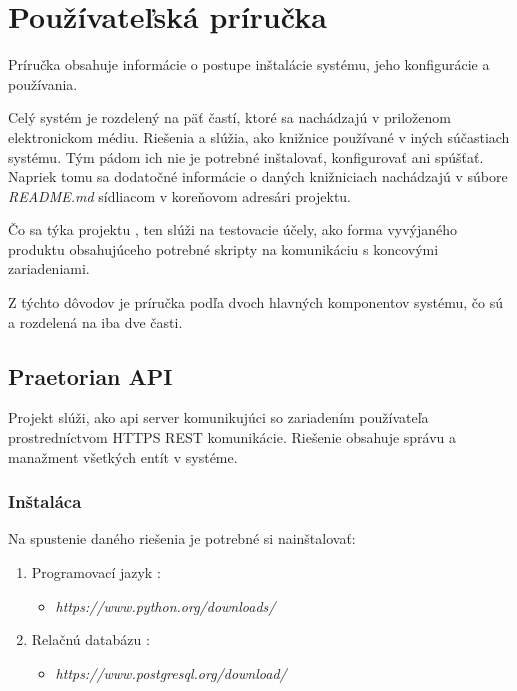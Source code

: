 \renewcommand\chaptername{Príloha}

\chapter{Používateľská príručka}

\renewcommand*{\thepage}{C\arabic{page}}
\setcounter{page}{1}

Príručka obsahuje informácie o postupe inštalácie systému, jeho konfigurácie a používania.

Celý systém je rozdelený na päť častí, ktoré sa nachádzajú v priloženom elektronickom médiu.
Riešenia  a  slúžia, ako knižnice používané v iných súčastiach systému.
Tým pádom ich nie je potrebné inštalovať, konfigurovať ani spúšťať.
Napriek tomu sa dodatočné informácie o daných knižniciach nachádzajú v súbore \emph{README.md} sídliacom v koreňovom adresári projektu.

Čo sa týka projektu , ten slúži na testovacie účely, ako forma vyvýjaného produktu
obsahujúceho potrebné skripty na komunikáciu s koncovými zariadeniami.

Z týchto dôvodov je príručka podľa dvoch hlavných komponentov systému, čo sú  a  rozdelená na iba dve časti.


\section{Praetorian API}

Projekt slúži, ako api server komunikujúci so zariadením používateľa prostredníctvom HTTPS REST komunikácie.
Riešenie obsahuje správu a manažment všetkých entít v systéme.

\subsection{Inštaláca}

Na spustenie daného riešenia je potrebné si nainštalovať:

\begin{enumerate}
\item Programovací jazyk :
\begin{itemize}
\item \emph{https://www.python.org/downloads/}
\end{itemize}
\item Relačnú databázu :
\begin{itemize}
\item \emph{https://www.postgresql.org/download/}
\end{itemize}
\end{enumerate}

